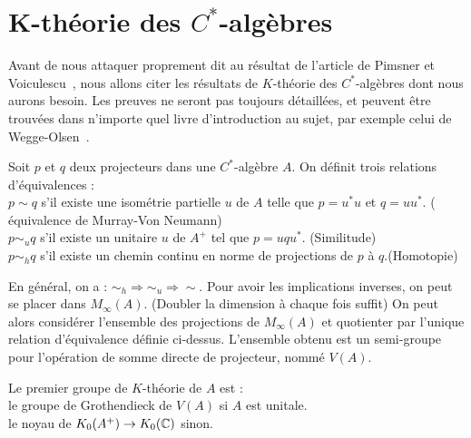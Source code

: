 \section{K-théorie des $C^*$-algèbres}

 
Avant de nous attaquer proprement dit au résultat de l'article de Pimsner et Voiculescu~\cite{PV}, nous allons citer les résultats de $K$-théorie des $C^*$-algèbres dont nous aurons besoin. Les preuves ne seront pas toujours détaillées, et peuvent être trouvées dans n'importe quel livre d'introduction au sujet, par exemple celui de Wegge-Olsen~\cite{WeggeOlsen}.\\

\begin{definition}
Soit $p$ et $q$ deux projecteurs dans une $C^*$-algèbre $A$. On définit trois relations d'équivalences :\\
$p\sim q$ s'il existe une isométrie partielle $u$ de $A$ telle que $p=u^*u $ et $q=uu^*$. ( équivalence de Murray-Von Neumann)\\
$p\sim_u q$ s'il existe un unitaire $u$ de $A^+$ tel que $p=uqu^*$. (Similitude)\\
$p\sim_h q$ s'il existe un chemin continu en norme de projections de $p$ à $q$.(Homotopie)\\
\end{definition}

En général, on a : $\sim_h \Rightarrow \sim_u \Rightarrow \sim$. Pour avoir les implications inverses, on peut se placer dans $M_\infty(A)$. (Doubler la dimension à chaque fois suffit) On peut alors considérer l'ensemble des projections de $M_\infty (A)$ et quotienter par l'unique relation d'équivalence définie ci-dessus. L'ensemble obtenu est un semi-groupe pour l'opération de somme directe de projecteur, nommé $V(A)$.\\

\begin{definition}
Le premier groupe de $K$-théorie de $A$ est :\\
le groupe de Grothendieck de $V(A)$ si $A$ est unitale.\\
le noyau de $K_0(A^+)\rightarrow K_0(\mathbb C)$ sinon.
\end{definition}

